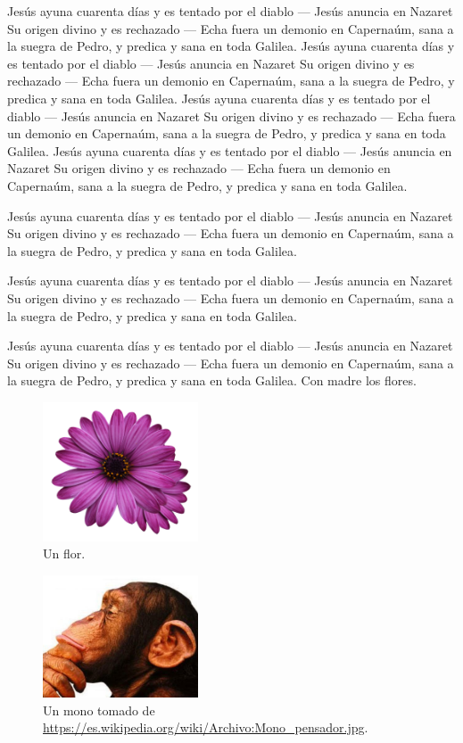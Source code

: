 \documentclass{article}
\begin{document}
Jesús ayuna cuarenta días y es tentado por el diablo --- Jesús anuncia en Nazaret Su origen divino y es rechazado --- Echa fuera un demonio en Capernaúm, sana a la suegra de Pedro, y predica y sana en toda Galilea.
Jesús ayuna cuarenta días y es tentado por el diablo --- Jesús anuncia en Nazaret Su origen divino y es rechazado --- Echa fuera un demonio en Capernaúm, sana a la suegra de Pedro, y predica y sana en toda Galilea.
Jesús ayuna cuarenta días y es tentado por el diablo --- Jesús anuncia en Nazaret Su origen divino y es rechazado --- Echa fuera un demonio en Capernaúm, sana a la suegra de Pedro, y predica y sana en toda Galilea.
Jesús ayuna cuarenta días y es tentado por el diablo --- Jesús anuncia en Nazaret Su origen divino y es rechazado --- Echa fuera un demonio en Capernaúm, sana a la suegra de Pedro, y predica y sana en toda Galilea.

Jesús ayuna cuarenta días y es tentado por el diablo --- Jesús anuncia en Nazaret Su origen divino y es rechazado --- Echa fuera un demonio en Capernaúm, sana a la suegra de Pedro, y predica y sana en toda Galilea.

Jesús ayuna cuarenta días y es tentado por el diablo --- Jesús anuncia en Nazaret Su origen divino y es rechazado --- Echa fuera un demonio en Capernaúm, sana a la suegra de Pedro, y predica y sana en toda Galilea.

Jesús ayuna cuarenta días y es tentado por el diablo --- Jesús anuncia en Nazaret Su origen divino y es rechazado --- Echa fuera un demonio en Capernaúm, sana a la suegra de Pedro, y predica y sana en toda Galilea.
Con madre los flores.




\begin{figure}
\centering\includegraphics[width=46mm]{flor.png}
\caption{Un flor.}
\label{flor}
\end{figure}


\begin{figure}
\centering\includegraphics[width=46mm]{mono.jpg}
\caption{Un mono tomado de \url{https://es.wikipedia.org/wiki/Archivo:Mono_pensador.jpg}.}
\label{mono}
\end{figure}





\end{document}
